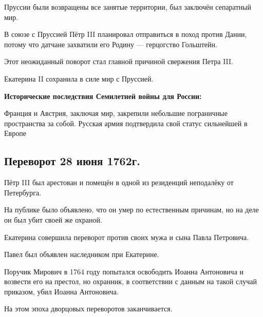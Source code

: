 Пруссии были возвращены все занятые территории, был заключён сепаратный мир. 

В союзе с Пруссией Пётр III планировал отправиться в поход против Дании, потому что датчане захватили его Родину — герцогство Гольштейн.

Этот неожиданный поворот стал главной причиной свержения Петра III.

Екатерина II сохранила в силе мир с Пруссией.

\textbf{Исторические последствия Семилетней войны для России:}

Франция и Австрия, заключая мир, закрепили небольшие пограничные пространства за собой. Русская армия подтвердила свой статус сильнейшей в Европе

\subsection{Переворот 28 июня 1762г.}

Пётр III был арестован и помещён в одной из резиденций неподалёку от Петербурга. 

На публике было объявлено, что он умер по естественным причинам, но на деле он был убит своей же охраной. 

Екатерина совершила переворот против своих мужа и сына Павла Петровича. 

Павел был объявлен наследником при Екатерине. 

Поручик Мирович в 1764 году попытался освободить Иоанна Антоновича и возвести его на престол, но охранник, в соответствии с данным на такой случай приказом, убил Иоанна Антоновича.

На этом эпоха дворцовых переворотов заканчивается.

